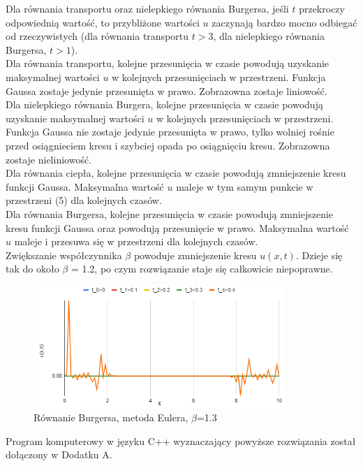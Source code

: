 \documentclass[12pt, a4paper]{article}
\begin{document}
Dla równania transportu oraz nielepkiego równania Burgersa, jeśli $t$ przekroczy odpowiednią wartość, to przybliżone wartości $u$ zaczynają bardzo mocno odbiegać od rzeczywistych (dla równania transportu $t>3$, dla nielepkiego równania Burgersa, $t>1$).\\

Dla równania transportu, kolejne przesunięcia w czasie powodują uzyskanie maksymalnej wartości $u$ w kolejnych przesunięciach w przestrzeni.  Funkcja Gaussa zostaje jedynie przesunięta w prawo.  Zobrazowna zostaje liniowość.\\

Dla nielepkiego równania Burgera, kolejne przesunięcia w czasie powodują uzyskanie maksymalnej wartości $u$ w kolejnych przesunięciach w przestrzeni. Funkcja Gaussa nie zostaje jedynie przesunięta w prawo, tylko wolniej rośnie przed osiągnieciem kresu i szybciej opada po osiągnięciu kresu. Zobrazowna zostaje nieliniowość.\\

Dla równania ciepła, kolejne przesunięcia w czasie powodują zmniejszenie kresu funkcji Gaussa. Maksymalna wartość $u$ maleje w tym samym punkcie w przestrzeni (5) dla kolejnych czasów.\\ 

Dla równania Burgersa, kolejne przesunięcia w czasie powodują zmniejszenie kresu funkcji Gaussa oraz powodują przesunięcie w prawo. Maksymalna wartość $u$ maleje i przesuwa się w przestrzeni dla kolejnych czasów.\\

Zwiększanie współczynnika $\beta$ powoduje zmniejszenie kresu $u(x,t)$. Dzieje się tak do około $\beta$ = 1.2, po czym rozwiązanie staje się całkowicie niepoprawne.\\
\begin{figure}[h]
\caption{Równanie Burgersa, metoda Eulera, $\beta$=1.3}
\centering
\includegraphics[width=0.85\textwidth]{10}
\end{figure}

Program komputerowy w języku C++ wyznaczający powyższe rozwiązania został dołączony w Dodatku A.
\end{document}
